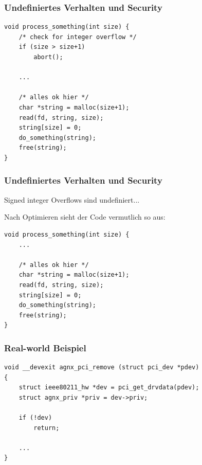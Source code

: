 \documentclass[12pt,compress]{beamer}
\begin{document}
\begin{frame}[fragile]
\frametitle{Undefiniertes Verhalten und Security}
\begin{lstlisting}
void process_something(int size) {
    /* check for integer overflow */
    if (size > size+1)
        abort();
    
    ...

    /* alles ok hier */
    char *string = malloc(size+1);
    read(fd, string, size);
    string[size] = 0;
    do_something(string);
    free(string);
}
\end{lstlisting}
\end{frame}


\begin{frame}[fragile]
\frametitle{Undefiniertes Verhalten und Security}

Signed integer Overflows sind undefiniert...

\vfill

Nach Optimieren sieht der Code vermutlich so aus:

\vfill

\begin{lstlisting}
void process_something(int size) {
    ...

    /* alles ok hier */
    char *string = malloc(size+1);
    read(fd, string, size);
    string[size] = 0;
    do_something(string);
    free(string);
}
\end{lstlisting}
\end{frame}

\begin{frame}[fragile]
\frametitle{Real-world Beispiel}

\begin{lstlisting}
void __devexit agnx_pci_remove (struct pci_dev *pdev)
{
    struct ieee80211_hw *dev = pci_get_drvdata(pdev);
    struct agnx_priv *priv = dev->priv; 

    if (!dev)
        return;

    ...
}
\end{lstlisting}
\end{frame}

\end{document}
